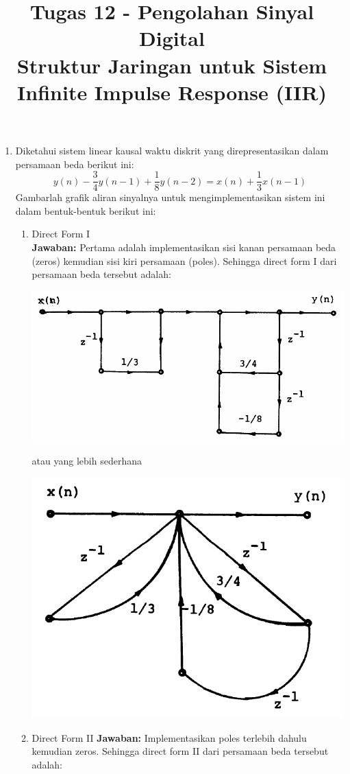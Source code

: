 \documentclass[12pt,a4paper]{article}
\title{Tugas 12 - Pengolahan Sinyal Digital\\
	Struktur Jaringan untuk Sistem Infinite Impulse Response (IIR)}
\date{}
\begin{document}
	\maketitle
	\date{}
	\begin{enumerate}
		\item Diketahui sistem linear kausal waktu diskrit yang direpresentasikan dalam persamaan beda berikut ini:
		\[ y(n) - \frac{3}{4}y(n-1) + \frac{1}{8}y(n-2) = x(n) + \frac{1}{3}x(n-1) \]
		Gambarlah grafik aliran sinyalnya untuk mengimplementasikan sistem ini dalam bentuk-bentuk berikut ini:
		\begin{enumerate}
			\item Direct Form I\\
			\textbf{Jawaban:} Pertama adalah implementasikan sisi kanan persamaan beda (zeros) kemudian sisi kiri persamaan (poles). Sehingga direct form I dari persamaan beda tersebut adalah:\\
			\begin{center}
				\includegraphics[width=0.7\linewidth]{img/img01}
			\end{center}
			atau yang lebih sederhana
			\begin{center}
				\includegraphics[width=0.5\linewidth]{img/img02}
			\end{center}
			\item Direct Form II
			\textbf{Jawaban:} Implementasikan poles terlebih dahulu kemudian zeros. Sehingga direct form II dari persamaan beda tersebut adalah:\\
			\begin{center}

\end{center}
\end{enumerate}
\end{enumerate}
\end{document}
